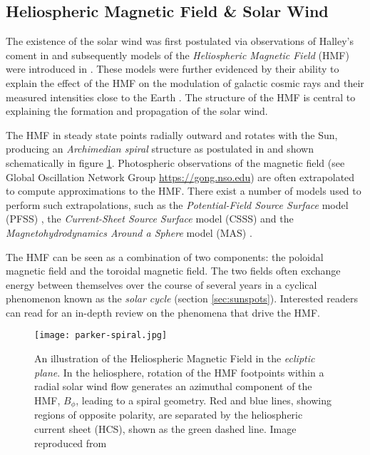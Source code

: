 \subsection{Heliospheric Magnetic Field \& Solar Wind}

The existence of the solar wind was first postulated via observations of Halley's coment in 
\citet{Bierman1,Bierman2,Bierman3} and subsequently models of the \emph{Heliospheric Magnetic Field} (HMF) 
were introduced in \citet{parker1958dynamics}. These models were further evidenced by their ability 
to explain the effect of the HMF on the modulation of galactic cosmic rays and their measured intensities 
close to the Earth \citep{ParkerSolarWind}. The structure of the HMF is central to explaining 
the formation and propagation of the solar wind. 

The HMF in steady state points radially outward and rotates with the Sun, producing an \emph{Archimedian spiral} 
structure as postulated in \cite{parker1958dynamics} and shown schematically in figure \ref{fig:parkerspiral}. 
Photospheric observations of the magnetic field (see Global Oscillation Network Group \url{https://gong.nso.edu}) 
are often extrapolated to compute approximations to the HMF. There exist a number of models used to perform such 
extrapolations, such as the \emph{Potential-Field Source Surface} model (PFSS) 
\citep{schatten1969model,altschuler1969magnetic}, the \emph{Current-Sheet Source Surface} model (CSSS) 
\citep{csss} and the \emph{Magnetohydrodynamics Around a Sphere} model (MAS) 
\citep{linker1999magnetohydrodynamic}. 

The HMF can be seen as a combination of two components: the poloidal magnetic field and the toroidal magnetic field.
The two fields often exchange energy between themselves over the course of several years in a cyclical phenomenon
known as the \emph{solar cycle} (section \ref{sec:sunspots}). Interested readers can read \citep{Owens2013} for an 
in-depth review on the phenomena that drive the HMF.

\begin{figure}
    \noindent\texttt{[image: parker-spiral.jpg]}
    \caption{\small{An illustration of the Heliospheric Magnetic Field in the \emph{ecliptic plane}. 
    In the heliosphere, rotation of the HMF footpoints within a radial solar wind flow generates an azimuthal 
    component of the HMF, $B_{\phi}$, leading to a spiral geometry. Red and blue lines, 
    showing regions of opposite polarity, are separated by the heliospheric current sheet (HCS), 
    shown as the green dashed line.
    Image reproduced from \citet{Owens2013}}}
    \label{fig:parkerspiral}
\end{figure}


